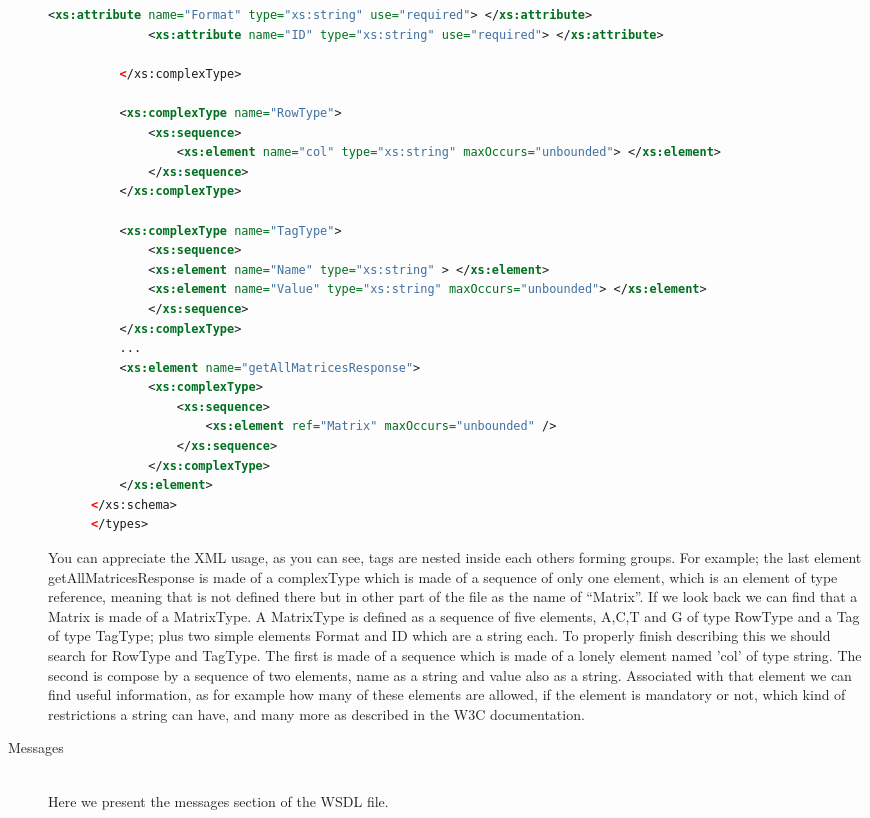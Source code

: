 \documentclass[a4paper,10pt]{article}
\begin{document}
\begin{description}
\begin{lstlisting}[language=XML]
		      <xs:attribute name="Format" type="xs:string" use="required"> </xs:attribute>
		      <xs:attribute name="ID" type="xs:string" use="required"> </xs:attribute>

	      </xs:complexType>

	      <xs:complexType name="RowType">
		      <xs:sequence>
			      <xs:element name="col" type="xs:string" maxOccurs="unbounded"> </xs:element>
		      </xs:sequence>
	      </xs:complexType>

	      <xs:complexType name="TagType">
		      <xs:sequence>
		      <xs:element name="Name" type="xs:string" > </xs:element>
		      <xs:element name="Value" type="xs:string" maxOccurs="unbounded"> </xs:element>
		      </xs:sequence>
	      </xs:complexType>
	      ...
	      <xs:element name="getAllMatricesResponse">
		      <xs:complexType>
			      <xs:sequence>
				      <xs:element ref="Matrix" maxOccurs="unbounded" />
			      </xs:sequence>
		      </xs:complexType>
	      </xs:element>
      </xs:schema>
      </types>
      \end{lstlisting}
      You can appreciate the XML usage, as you can see, tags are nested inside each others forming groups. For example; the last element getAllMatricesResponse is made of a complexType which is made of a sequence of only one element, which is an element of type reference, meaning that is not defined there but in other part of the file as the name of “Matrix”. If we look back we can find that a Matrix is made of a MatrixType. A MatrixType is defined as a sequence of five elements, A,C,T and G of type RowType and a Tag of type TagType; plus two simple elements Format and ID which are a string each. To properly finish describing this we should search for RowType and TagType. The first is made of a sequence which is made of a lonely element named 'col' of type string. The second is compose by a sequence of two elements, name as a string and value also as a string. Associated with that element we can find useful information, as for example how many of these elements are allowed, if the element is mandatory or not, which kind of restrictions a string can have, and many more as described in the W3C documentation.

      \item[Messages] \hfill \\

      Here we present the messages section of the WSDL file.


\end{description}
\end{document}
